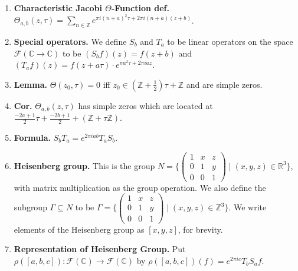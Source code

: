\begin{enumerate}
	\item \textbf{Characteristic Jacobi $\Theta$-Function def. } $\Theta_{a,b}(z,\tau) = \sum_{n \in \mathbb{Z}} e^{\pi i(n+a)^2 \tau + 2\pi i(n+a)(z+b)}$. 
	\item \textbf{Special operators. } We define $S_b$ and $T_a$ to be linear operators on the space $\mathscr{F}(\mathbb{C} \to \mathbb{C})$ to be $(S_b f)(z) = f(z+b)$ and $(T_a f)(z) = f(z+a\tau) \cdot e^{\pi a^2 \tau + 2\pi i az}$. 
	\item \textbf{Lemma. } $\Theta(z_0,\tau) = 0$ iff $z_0 \in (\mathbb{Z} + \frac{1}{2})\tau + \mathbb{Z}$ and are simple zeros. 
	\item \textbf{Cor. } $\Theta_{a,b}(z,\tau)$ has simple zeros which are located at $\frac{-2a+1}{2}\tau + \frac{-2b+1}{2} + (\mathbb{Z} + \tau\mathbb{Z})$. 
	\item \textbf{Formula. } $S_b T_a = e^{2\pi iab} T_a S_b$. 
	\item \textbf{Heisenberg group. } This is the group $N = \{
	\begin{pmatrix}
	1 & x & z \\
	0 & 1 & y \\
	0 & 0 & 1
	\end{pmatrix}
	\mid (x,y,z) \in \mathbb{R}^3\}$, with matrix multiplication as the group operation. We also define the subgroup $\Gamma \subseteq N$ to be $\Gamma = \{
	\begin{pmatrix}
	1 & x & z \\
	0 & 1 & y \\
	0 & 0 & 1
	\end{pmatrix}
	\mid (x,y,z) \in \mathbb{Z}^3 \}$. We write elements of the Heisenberg group as $[x,y,z]$, for brevity. 
	\item \textbf{Representation of Heisenberg Group. } Put $\rho([a,b,c]): \mathscr{F}(\mathbb{C}) \to \mathscr{F}(\mathbb{C})$ by $\rho([a,b,c])(f) = e^{2\pi i c} T_b S_a f$. 
\end{enumerate}  
 

